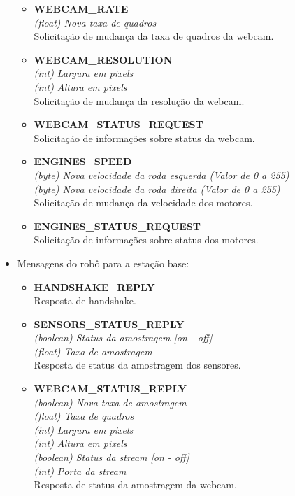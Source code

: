 \begin{itemize}
\begin{itemize}
      \item \textbf{WEBCAM\_RATE} \\
	\textit{(float) Nova taxa de quadros}\\
	Solicitação de mudança da taxa de quadros da webcam.

      \item \textbf{WEBCAM\_RESOLUTION} \\
	\textit{(int) Largura em pixels }\\
	\textit{(int) Altura em pixels}\\
	Solicitação de mudança da resolução da webcam.

      \item \textbf{WEBCAM\_STATUS\_REQUEST}\\
	Solicitação de informações sobre status  da webcam.

      \item \textbf{ENGINES\_SPEED} \\
	\textit{(byte) Nova velocidade da roda esquerda (Valor de 0 a 255) }\\
	\textit{(byte) Nova velocidade da roda direita (Valor de 0 a 255)}\\
	Solicitação de mudança da velocidade dos motores.

      \item \textbf{ENGINES\_STATUS\_REQUEST}\\
	Solicitação de informações sobre status dos motores.

    \end{itemize}

  \item Mensagens do robô para a estação base:

    \begin{itemize}
      \item \textbf{HANDSHAKE\_REPLY}\\
	Resposta de handshake.

      \item \textbf{SENSORS\_STATUS\_REPLY} \\
	\textit{(boolean) Status da amostragem [on - off] }\\
	\textit{(float) Taxa de amostragem}\\
	Resposta de status da amostragem dos sensores.

      \item \textbf{WEBCAM\_STATUS\_REPLY} \\
	\textit{(boolean) Nova taxa de amostragem }\\
	\textit{(float) Taxa de quadros }\\
	\textit{(int) Largura em pixels }\\
	\textit{(int) Altura em pixels }\\
	\textit{(boolean) Status da stream [on - off] }\\
	\textit{(int) Porta da stream}\\
	Resposta de status da amostragem da webcam.


\end{itemize}
\end{itemize}
